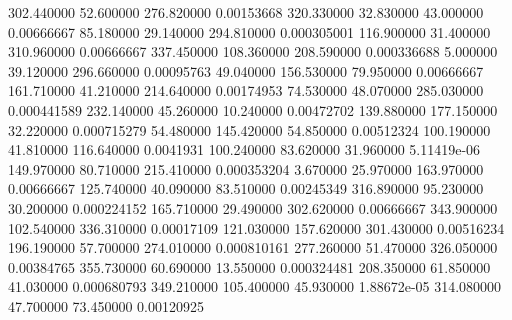 302.440000	52.600000	276.820000	0.00153668
320.330000	32.830000	43.000000	0.00666667
85.180000	29.140000	294.810000	0.000305001
116.900000	31.400000	310.960000	0.00666667
337.450000	108.360000	208.590000	0.000336688
5.000000	39.120000	296.660000	0.00095763
49.040000	156.530000	79.950000	0.00666667
161.710000	41.210000	214.640000	0.00174953
74.530000	48.070000	285.030000	0.000441589
232.140000	45.260000	10.240000	0.00472702
139.880000	177.150000	32.220000	0.000715279
54.480000	145.420000	54.850000	0.00512324
100.190000	41.810000	116.640000	0.0041931
100.240000	83.620000	31.960000	5.11419e-06
149.970000	80.710000	215.410000	0.000353204
3.670000	25.970000	163.970000	0.00666667
125.740000	40.090000	83.510000	0.00245349
316.890000	95.230000	30.200000	0.000224152
165.710000	29.490000	302.620000	0.00666667
343.900000	102.540000	336.310000	0.00017109
121.030000	157.620000	301.430000	0.00516234
196.190000	57.700000	274.010000	0.000810161
277.260000	51.470000	326.050000	0.00384765
355.730000	60.690000	13.550000	0.000324481
208.350000	61.850000	41.030000	0.000680793
349.210000	105.400000	45.930000	1.88672e-05
314.080000	47.700000	73.450000	0.00120925
